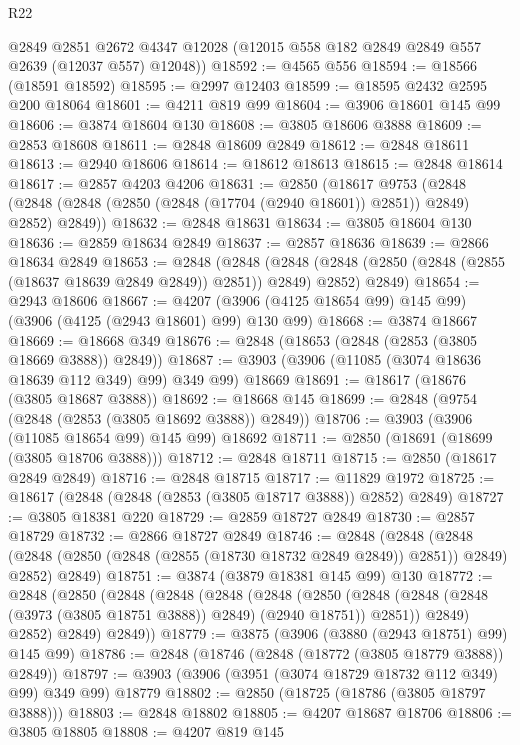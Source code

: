 \begin{lexlean}{R22}
\begin{coremodule}
      @2849
      @2851
      @2672
      @4347
      @12028
      (@12015 @558 @182 @2849 @2849 @557 @2639 (@12037 @557) @12048))
@18592 := @4565 @556
@18594 := @18566 (@18591 @18592)
@18595 := @2997 @12403
@18599 := @18595 @2432 @2595 @200 @18064
@18601 := @4211 @819 @99
@18604 := @3906 @18601 @145 @99
@18606 := @3874 @18604 @130
@18608 := @3805 @18606 @3888
@18609 := @2853 @18608
@18611 := @2848 @18609 @2849
@18612 := @2848 @18611
@18613 := @2940 @18606
@18614 := @18612 @18613
@18615 := @2848 @18614
@18617 := @2857 @4203 @4206
@18631 := @2850
    (@18617
      @9753
      (@2848 (@2848 (@2848 (@2850 (@2848 (@17704 (@2940 @18601)) @2851)) @2849) @2852) @2849))
@18632 := @2848 @18631
@18634 := @3805 @18604 @130
@18636 := @2859 @18634 @2849
@18637 := @2857 @18636
@18639 := @2866 @18634 @2849
@18653 := @2848
    (@2848
      (@2848 (@2848 (@2850 (@2848 (@2855 (@18637 @18639 @2849 @2849)) @2851)) @2849) @2852)
      @2849)
@18654 := @2943 @18606
@18667 := @4207 (@3906 (@4125 @18654 @99) @145 @99) (@3906 (@4125 (@2943 @18601) @99) @130 @99)
@18668 := @3874 @18667
@18669 := @18668 @349
@18676 := @2848 (@18653 (@2848 (@2853 (@3805 @18669 @3888)) @2849))
@18687 := @3903 (@3906 (@11085 (@3074 @18636 @18639 @112 @349) @99) @349 @99) @18669
@18691 := @18617 (@18676 (@3805 @18687 @3888))
@18692 := @18668 @145
@18699 := @2848 (@9754 (@2848 (@2853 (@3805 @18692 @3888)) @2849))
@18706 := @3903 (@3906 (@11085 @18654 @99) @145 @99) @18692
@18711 := @2850 (@18691 (@18699 (@3805 @18706 @3888)))
@18712 := @2848 @18711
@18715 := @2850 (@18617 @2849 @2849)
@18716 := @2848 @18715
@18717 := @11829 @1972
@18725 := @18617 (@2848 (@2848 (@2853 (@3805 @18717 @3888)) @2852) @2849)
@18727 := @3805 @18381 @220
@18729 := @2859 @18727 @2849
@18730 := @2857 @18729
@18732 := @2866 @18727 @2849
@18746 := @2848
    (@2848
      (@2848 (@2848 (@2850 (@2848 (@2855 (@18730 @18732 @2849 @2849)) @2851)) @2849) @2852)
      @2849)
@18751 := @3874 (@3879 @18381 @145 @99) @130
@18772 := @2848
    (@2850
      (@2848
        (@2848
          (@2848
            (@2848
              (@2850
                (@2848 (@2848 (@2848 (@3973 (@3805 @18751 @3888)) @2849) (@2940 @18751)) @2851))
              @2849)
            @2852)
          @2849)
        @2849))
@18779 := @3875 (@3906 (@3880 (@2943 @18751) @99) @145 @99)
@18786 := @2848 (@18746 (@2848 (@18772 (@3805 @18779 @3888)) @2849))
@18797 := @3903 (@3906 (@3951 (@3074 @18729 @18732 @112 @349) @99) @349 @99) @18779
@18802 := @2850 (@18725 (@18786 (@3805 @18797 @3888)))
@18803 := @2848 @18802
@18805 := @4207 @18687 @18706
@18806 := @3805 @18805
@18808 := @4207 @819 @145

\end{coremodule}
\end{lexlean}
